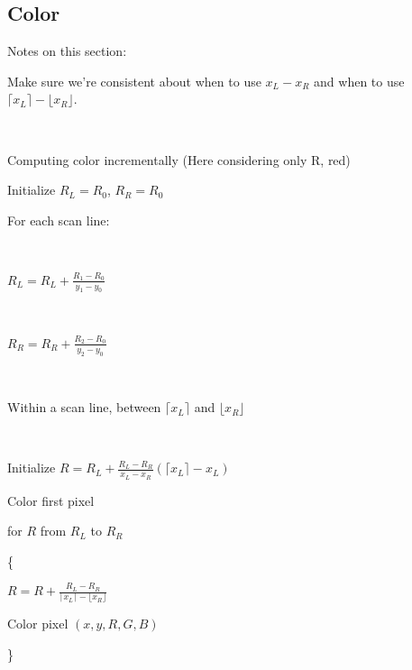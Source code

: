 \subsection{Color}

{\color{red}
	Notes on this section:  
	
	Make sure we're consistent about when to use $x_L - x_R$ and when to use $\lceil x_L \rceil - \lfloor x_R \rfloor$.
}

\

Computing color incrementally (Here considering only R, red)

Initialize $R_L = R_0$, $R_R = R_0$

For each scan line:

\

\qquad $\displaystyle R_L = R_L + \frac{R_1 - R_0}{y_1 - y_0}$

\

\qquad $\displaystyle R_R = R_R + \frac{R_2 - R_0}{y_2 - y_0}$

\

Within a scan line, between $\lceil x_L \rceil$ and $\lfloor  x_R \rfloor$

\

\qquad Initialize $\displaystyle R = R_L + \frac{R_L - R_R}{x_L - x_R} \left( \lceil x_L \rceil - x_L \right)$

\qquad Color first pixel

\qquad for $R$ from $R_L$ to $R_R$

\qquad \{

\qquad \qquad $\displaystyle R = R + \frac{R_L - R_R}{\lceil x_L \rceil - \lfloor x_R \rfloor } $

\qquad {}

\qquad \qquad Color pixel $(x, y, R, G, B)$

\qquad \}

